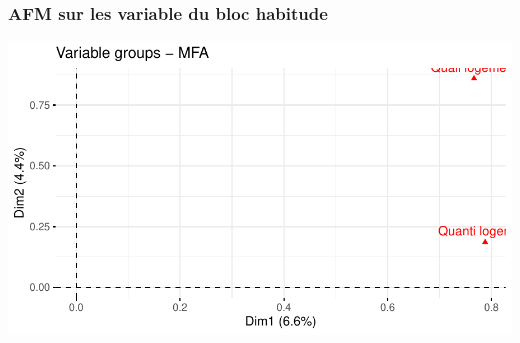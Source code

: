\documentclass[11pt,a4paper, x11names]{article}\usepackage[]{graphicx}\usepackage[]{color}
\makeatletter
\def\maxwidth{ %
  \ifdim\Gin@nat@width>\linewidth
    \linewidth
  \else
    \Gin@nat@width
  \fi
}
\newenvironment{knitrout}{}{} %
\makeatother
\begin{document}
\subsubsection{AFM sur les variable du bloc habitude}
\begin{minipage}{0.49\linewidth}
\begin{mdframed}
\begin{knitrout}
\color{fgcolor}
\includegraphics[width=\maxwidth]{figure/unnamed-chunk-22-1} 
\end{knitrout}

\end{mdframed}
\end{minipage}


\end{document}
